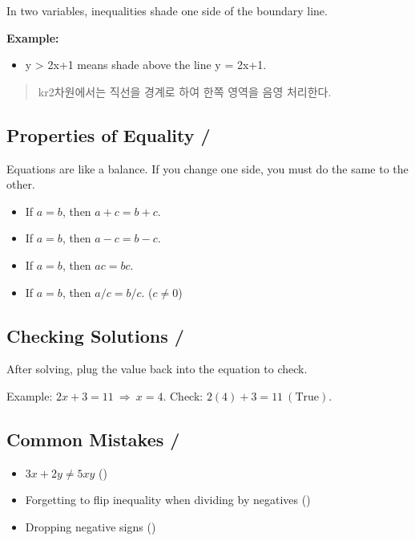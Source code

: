 \blockquote{}

In two variables, inequalities shade one side of the boundary line.  

\textbf{Example:}
\begin{itemize}
    \item y > 2x+1 means shade above the line y = 2x+1.
\end{itemize}

\blockquote{kr{2차원에서는 직선을 경계로 하여 한쪽 영역을 음영 처리한다.}}

\newpage
\subsection{Properties of Equality / }
Equations are like a balance. If you change one side, you must do the same to the other.  

\begin{itemize}
  \item If $a=b$, then $a+c=b+c$. 
  \item If $a=b$, then $a-c=b-c$. 
  \item If $a=b$, then $ac=bc$. 
  \item If $a=b$, then $a/c=b/c$. ($c \neq 0$) 
\end{itemize}

\subsection{Checking Solutions / }
After solving, plug the value back into the equation to check.  

Example: $2x+3=11 \ \Rightarrow \ x=4$.  
Check: $2(4)+3=11 \ (\text{True}).$  

\subsection{Common Mistakes / }
\begin{itemize}
  \item $3x+2y \neq 5xy$ ()  
  \item Forgetting to flip inequality when dividing by negatives ()  
  \item Dropping negative signs ()  
\end{itemize}